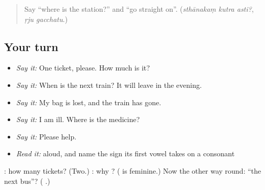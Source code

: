 \label{lesson:SA-R281-at-the-station}



\begin{quote}
Say \textquotedblleft{}where is the station?\textquotedblright{} and \textquotedblleft{}go straight on\textquotedblright{}. (\emph{sthānakaṃ kutra asti?}, \emph{ṛju gacchatu}.)
\end{quote}

\subsection*{Your turn}
\begin{itemize}
\raggedright
  \item \emph{Say it:} One ticket, please. How much is it?
  \item \emph{Say it:} When is the next train? It will leave in the evening.
  \item \emph{Say it:} My bag is lost, and the train has gone.
  \item \emph{Say it:} I am ill. Where is the medicine?
  \item \emph{Say it:} Please help.
  \item \emph{Read it:} \textbf{} aloud, and name the sign its first vowel takes on a consonant
\end{itemize}

\begin{tcolorbox}[breakable,colback=teal!4,colframe=teal!35!black,title={Before you move on}]
\textbf{ }: how many tickets? (Two.) \textbf{  }: why \textbf{}? (\textbf{} is feminine.) Now the other way round: \textquotedblleft{}the next bus\textquotedblright{}? (\textbf{ }.)
\end{tcolorbox}
